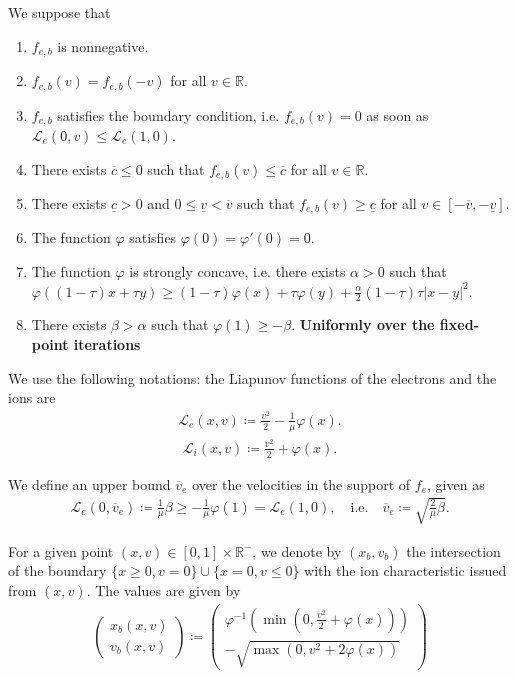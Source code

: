 \documentclass{article}
\numberwithin{equation}{section}
\newcommand{\todo}[1]{{\color{red}\textbf{#1}}}
\newcommand{\vv}[1]{\begin{pmatrix} #1 \end{pmatrix}} %
\newcommand{\ve}{{\overline{v}_e}} %
\newcommand{\domfel}{{\underline{v}}} %
\newcommand{\domfeu}{{\overline{v}}} %
\newcommand{\minfe}{{\underline{c}}} %
\newcommand{\maxfe}{{\overline{c}}} %
\begin{document}
We suppose that 
\begin{enumerate}
\item $f_{e,b}$ is nonnegative.
\item $f_{e,b}(v) = f_{e,b}(-v)$ for all $v\in\mathbb{R}$.
\item $f_{e,b}$ satisfies the boundary condition, i.e. $f_{e,b}(v) = 0$ as soon as $\mathcal{L}_e(0,v) \leqslant \mathcal{L}_e(1,0)$.
\item There exists $\maxfe \leqslant 0$ such that $f_{e,b}(v) \leqslant \maxfe$ for all $v \in \mathbb{R}$.
\item There exists $\minfe > 0$ and $0 \leqslant \domfel < \domfeu$ such that $f_{e,b}(v) \geqslant \minfe$ for all $v\in[-\domfeu,-\domfel]$.
\item The function $\varphi$ satisfies $\varphi(0)=\varphi'(0)=0$.
\item The function $\varphi$ is strongly concave, i.e. there exists $\alpha>0$ such that $\varphi((1-\tau) x + \tau y) \geqslant (1-\tau) \varphi(x)+\tau \varphi(y) + \frac{\alpha}{2} (1-\tau)\tau \left|x-y\right|^2$.
\item There exists $\beta > \alpha$ such that $\varphi(1) \geqslant - \beta$. \todo{Uniformly over the fixed-point iterations}
\end{enumerate}

We use the following notations: the Liapunov functions of the electrons and the ions are
\begin{align}\label{eq:def_Le}
	\mathcal{L}_e(x,v) \coloneqq \frac{v^2}{2} - \frac{1}{\mu} \varphi(x).
\end{align}
\begin{align}\label{eq:def_Li}
	\mathcal{L}_i(x,v) \coloneqq \frac{v^2}{2} + \varphi(x).
\end{align}

We define an upper bound $\ve$ over the velocities in the support of $f_e$, given as
\begin{align}\label{eq:def_ve}
	\mathcal{L}_e(0,\ve) \coloneqq \frac{1}{\mu} \beta \geqslant -\frac{1}{\mu}\varphi(1) = \mathcal{L}_e(1,0), \quad\text{i.e.}\quad \ve \coloneqq \sqrt{\frac{2}{\mu}\beta}.
\end{align}

For a given point $(x,v) \in [0,1]\times \mathbb{R}^{-}$, we denote by $(x_b, v_b)$ the intersection of the boundary $\{x\geqslant0,v=0\} \cup \{x=0,v\leqslant 0\}$ with the ion characteristic issued from $(x,v)$. The values are given by
\begin{align}\label{eq:def_xb_vb}
	\vv{x_b(x,v) \\ v_b(x,v)} \coloneqq \vv{\varphi^{-1}\left(\min\left(0,\frac{v^2}{2} + \varphi(x)\right)\right) \\ - \sqrt{\max\left(0,v^2 + 2\varphi(x)\right)}}
\end{align}
\end{document}
